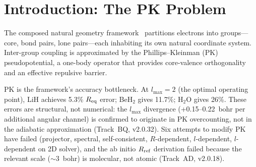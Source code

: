 \documentclass[aps,pra,twocolumn,superscriptaddress,longbibliography]{revtex4-2}
\begin{document}
\begin{abstract}
We report computational results from the first three phases.  The
convergence concern is resolved: the multipole expansion of the
cross-center potential terminates exactly at $L_{\max} = 2l_{\max}$
by Gaunt selection rules (33 one-body terms at $n_{\max}=2$).  The
balanced Hamiltonian has 878 Pauli terms (Conjecture~1 confirmed).
Four-electron FCI gives $R_{\rm eq}$ error of 7.0\% and
$D_e = 0.037$~Ha---the only bound configuration among all four
coupling schemes tested (Conjecture~2 not confirmed in strict sense,
but the comparison crosses FCI regimes).  At $n_{\max} = 3$ ($Q = 84$),
single-point FCI gives 0.20\% energy error (down from 1.8\%) with
analytical integrals (incomplete gamma functions, machine precision),
confirming convergence.  The $R_{\rm eq}$ drift is structural to the
block decomposition ($+0.053$~bohr per $n_{\max}$ step, $3\times$
smaller than PK's $+0.15$--$0.22$~bohr/$l_{\max}$), not numerical.
\end{abstract}

\maketitle

\section{Introduction: The PK Problem}
\label{sec:intro}

The composed natural geometry framework~\cite{loutey_paper17}
partitions electrons into groups---core, bond pairs, lone pairs---each
inhabiting its own natural coordinate system.  Inter-group coupling is
approximated by the Phillips--Kleinman (PK) pseudopotential, a
one-body operator that provides core-valence orthogonality and an
effective repulsive barrier.

PK is the framework's accuracy bottleneck.  At $l_{\max} = 2$ (the
optimal operating point), LiH achieves 5.3\% $R_{\rm eq}$ error;
BeH$_2$ gives 11.7\%; H$_2$O gives 26\%.  These errors are
structural, not numerical: the $l_{\max}$ divergence
(+0.15--0.22~bohr per additional angular channel) is confirmed to
originate in PK overcounting, not in the adiabatic approximation
(Track~BQ, v2.0.32).  Six attempts to modify PK have failed
(projector, spectral, self-consistent, $R$-dependent, $l$-dependent,
$l$-dependent on 2D solver), and the ab initio $R_{\rm ref}$
derivation failed because the relevant scale (${\sim}3$~bohr) is
molecular, not atomic (Track~AD, v2.0.18).
\end{document}
